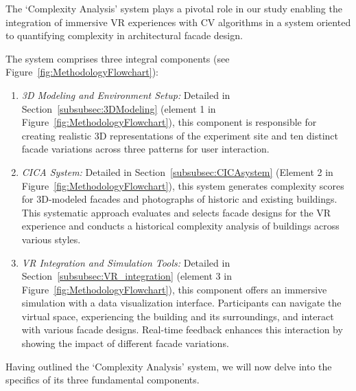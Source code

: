The `Complexity Analysis' system plays a pivotal role in our study enabling the integration of immersive VR experiences with CV algorithms in a system oriented to quantifying complexity in architectural facade design.

The system comprises three integral components (see Figure~\ref{fig:MethodologyFlowchart}):

\begin{enumerate}
\item \textit{3D Modeling and Environment Setup:} Detailed in Section~\ref{subsubsec:3DModeling} (element 1 in Figure~\ref{fig:MethodologyFlowchart}), this component is responsible for creating realistic 3D representations of the experiment site and ten distinct facade variations across three patterns for user interaction.

\item \textit{CICA System:} Detailed in Section~\ref{subsubsec:CICAsystem} (Element 2 in Figure~\ref{fig:MethodologyFlowchart}), this system generates complexity scores for 3D-modeled facades and photographs of historic and existing buildings.
This systematic approach evaluates and selects facade designs for the VR experience and conducts a historical complexity analysis of buildings across various styles.

\item \textit{VR Integration and Simulation Tools:} Detailed in Section~\ref{subsubsec:VR_integration} (element 3 in Figure~\ref{fig:MethodologyFlowchart}), this component offers an immersive simulation with a data visualization interface.
Participants can navigate the virtual space, experiencing the building and its surroundings, and interact with various facade designs.
Real-time feedback enhances this interaction by showing the impact of different facade variations.
\end{enumerate}

Having outlined the `Complexity Analysis' system, we will now delve into the specifics of its three fundamental components.



